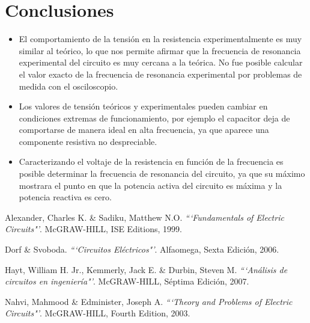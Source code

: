 \documentclass[twocolumn]{IEEEtran}
\begin{document}
\section{Conclusiones}
\begin{itemize}
 \item El comportamiento de la tensión en la resistencia experimentalmente es muy similar al teórico, lo que nos permite afirmar que la frecuencia de resonancia experimental del circuito es muy cercana a la teórica. No fue posible calcular el valor exacto de la frecuencia de resonancia experimental por problemas de medida con el osciloscopio.
 \item Los valores de tensión teóricos y experimentales pueden cambiar en condiciones extremas de funcionamiento, por ejemplo el capacitor deja de comportarse de manera ideal en alta frecuencia, ya que aparece una componente resistiva no despreciable.
 \item Caracterizando el voltaje de la resistencia en función de la frecuencia es posible determinar la frecuencia de resonancia del circuito, ya que su máximo mostrara el punto en que la potencia activa del circuito es máxima y la potencia reactiva es cero.
\end{itemize}


\begin{thebibliography}{99}
 Alexander, Charles K. \&  Sadiku, Matthew N.O.
{\em ```Fundamentals of Electric Circuits"'}.
McGRAW-HILL, ISE Editions, 1999.

 Dorf  \& Svoboda.
{\em ```Circuitos Eléctricos"'}.
Alfaomega, Sexta Edición, 2006.

 Hayt, William H. Jr., Kemmerly, Jack E. \& Durbin, Steven M.
{\em ```Análisis de circuitos en ingeniería"'}.
McGRAW-HILL, Séptima Edición, 2007.

 Nahvi, Mahmood \& Edminister, Joseph A.
{\em ```Theory and Problems of Electric Circuits"'}.
McGRAW-HILL, Fourth Edition, 2003.

\end{thebibliography}
\end{document}
